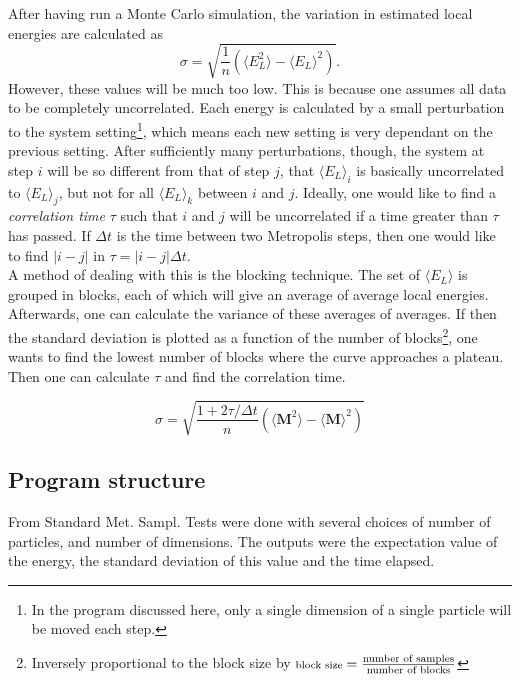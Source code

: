 \documentclass[english, a4paper]{article}
\newcommand\lr[1]{\left(#1\right)}
\begin{document}
After having run a Monte Carlo simulation, the variation in estimated local energies are calculated as
\begin{equation}
\sigma = \sqrt{\frac{1}{n}\lr{\langle E_L^2 \rangle - \langle E_L \rangle^2}}. \label{uncorelatedVariance}
\end{equation} 
However, these values will be much too low.
This is because one assumes all data to be completely uncorrelated. Each energy is calculated by a small perturbation to the system setting\footnote{In the program discussed here, only a single dimension of a single particle will be moved each step.}, which means each new setting is very dependant on the previous setting. After sufficiently many perturbations, though, the system at step $i$ will be so different from that of step $j$, that $\langle E_L\rangle_i$ is basically uncorrelated to  $\langle E_L\rangle_j$, but not for all $\langle E_L\rangle_k$ between $i$ and $j$. Ideally, one would like to find a \emph{correlation time} $\tau$ such that $i$ and $j$ will be uncorrelated if a time greater than $\tau$ has passed. If $\Delta t$ is the time between two Metropolis steps, then one would like to find $|i-j|$ in $\tau = |i-j|\Delta t$.\\
A method of dealing with this is the blocking technique. The set of $\langle E_L\rangle$ is grouped in blocks, each of which will give an average of average local energies. Afterwards, one can calculate the variance of these averages of averages. If then the standard deviation is plotted as a function of the number of blocks\footnote{Inversely proportional to the block size by $\text{\scriptsize block size} = \frac{\text{number of samples}}{\text{number of blocks}}$}, one wants to find the lowest number of blocks where the curve approaches a plateau. Then one can calculate $\tau$ and find the correlation time.

\begin{equation}
	\sigma=\sqrt{\frac{1+2\tau/\Delta t}{n}\left(\langle \mathbf{M}^2\rangle-\langle \mathbf{M}\rangle^2\right)}
\end{equation}

\subsection{Program structure}

From Standard Met. Sampl.
Tests were done with several choices of number of particles, and number of dimensions.
The outputs were the expectation value of the energy, the standard deviation of this value and the time elapsed.
\end{document}
